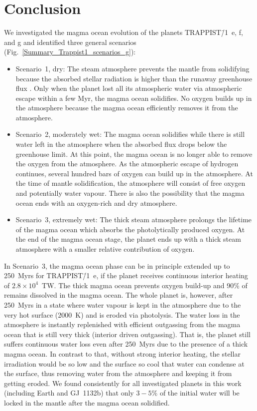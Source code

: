 \documentclass[oneside,twocolumn]{article}
\begin{document}
\section{Conclusion}
\label{sec: conclusion}
We investigated the magma ocean evolution of the planets TRAPPIST\=/1~e, f, and g and identified three general scenarios (Fig.~\ref{Summary_Trappist1_scenarios_g}):
\begin{itemize}
    \item Scenario~1, dry: The steam atmosphere prevents the mantle from solidifying because the absorbed stellar radiation is higher than the runaway greenhouse flux \citep[Sec.~\ref{Sec_Flux} and][]{Goldblatt2013}. Only when the planet lost all its atmospheric water via atmospheric escape within a few Myr, the magma ocean solidifies. No oxygen builds up in the atmosphere because the magma ocean efficiently removes it from the atmosphere.
    \item Scenario~2, moderately wet: The magma ocean solidifies while there is still water left in the atmosphere when the absorbed flux drops below the greenhouse limit. At this point, the magma ocean is no longer able to remove the oxygen from the atmosphere. As the atmospheric escape of hydrogen continues, several hundred bars of oxygen can build up in the atmosphere. At the time of mantle solidification, the atmosphere will consist of free oxygen and potentially water vapour. There is also the possibility that the magma ocean ends with an oxygen-rich and dry atmosphere.
    \item Scenario~3, extremely wet:
    The thick steam atmosphere prolongs the lifetime of the magma ocean which absorbs the photolytically produced oxygen. At the end of the magma ocean stage, the planet ends up with a thick steam atmosphere with a smaller relative contribution of oxygen.
\end{itemize}

In Scenario~3, the magma ocean phase can be in principle extended up to 250~Myrs for TRAPPIST\=/1~e, if the planet receives continuous interior heating of $2.8 \times 10^4$~TW. The thick magma ocean prevents oxygen build-up and 90\% of  remains dissolved in the magma ocean. The whole planet is, however, after 250~Myrs in a state where water vapour is kept in the atmosphere due to the very hot surface (2000~K) and is eroded via photolysis. The water loss in the atmosphere is instantly replenished with efficient outgassing from the magma ocean that is still very thick (interior driven outgassing). That is, the planet still suffers continuous water loss even after 250~Myrs due to the presence of a thick magma ocean. In contrast to that, without strong interior heating, the stellar irradiation would be so low and the surface so cool that water can condense at the surface, thus removing water from the atmosphere and keeping it from getting eroded.
We found consistently for all investigated planets in this work (including Earth and GJ~1132b) that only $3-5\%$ of the initial water will be locked in the mantle after the magma ocean solidified.
\end{document}
